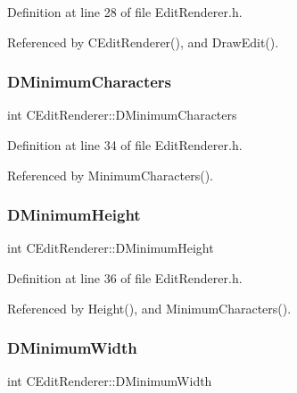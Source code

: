 Definition at line 28 of file Edit\+Renderer.\+h.



Referenced by C\+Edit\+Renderer(), and Draw\+Edit().

\hypertarget{classCEditRenderer_ae5d0bd249b2d483c361b0bf9c16c15d3}{}\label{classCEditRenderer_ae5d0bd249b2d483c361b0bf9c16c15d3} 
\subsubsection{\texorpdfstring{D\+Minimum\+Characters}{DMinimumCharacters}}
{\footnotesize\ttfamily int C\+Edit\+Renderer\+::\+D\+Minimum\+Characters\hspace{0.3cm}{\ttfamily [protected]}}



Definition at line 34 of file Edit\+Renderer.\+h.



Referenced by Minimum\+Characters().

\hypertarget{classCEditRenderer_a9e063123747e147ef1c35bd962205fbd}{}\label{classCEditRenderer_a9e063123747e147ef1c35bd962205fbd} 
\subsubsection{\texorpdfstring{D\+Minimum\+Height}{DMinimumHeight}}
{\footnotesize\ttfamily int C\+Edit\+Renderer\+::\+D\+Minimum\+Height\hspace{0.3cm}{\ttfamily [protected]}}



Definition at line 36 of file Edit\+Renderer.\+h.



Referenced by Height(), and Minimum\+Characters().

\hypertarget{classCEditRenderer_aba068f1e6d267e5ac0ed5752304133e8}{}\label{classCEditRenderer_aba068f1e6d267e5ac0ed5752304133e8} 
\subsubsection{\texorpdfstring{D\+Minimum\+Width}{DMinimumWidth}}
{\footnotesize\ttfamily int C\+Edit\+Renderer\+::\+D\+Minimum\+Width\hspace{0.3cm}{\ttfamily [protected]}}



